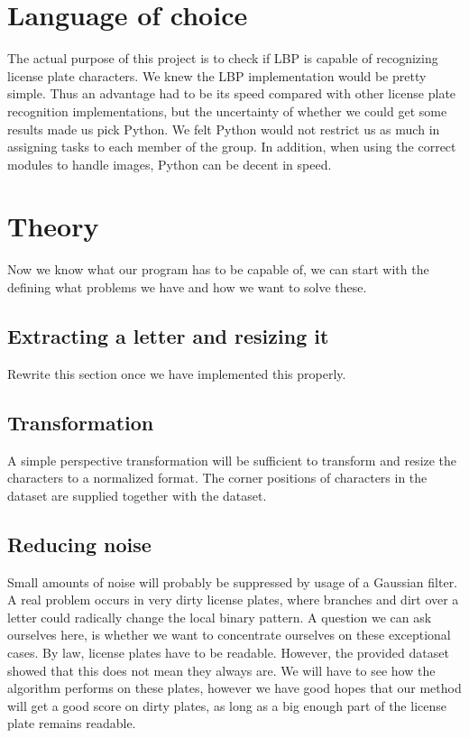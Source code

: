 \documentclass[a4paper]{article}
\begin{document}
\section{Language of choice}

The actual purpose of this project is to check if LBP is capable of recognizing
license plate characters. We knew the LBP implementation would be pretty
simple. Thus an advantage had to be its speed compared with other license plate 
recognition implementations, but the uncertainty of whether we could get some
results made us pick Python. We felt Python would not restrict us as much in 
assigning tasks to each member of the group. In addition, when using the
correct modules to handle images, Python can be decent in speed.

\section{Theory}

Now we know what our program has to be capable of, we can start with the
defining what problems we have and how we want to solve these.

\subsection{Extracting a letter and resizing it}

Rewrite this section once we have implemented this properly.

\subsection{Transformation}

A simple perspective transformation will be sufficient to transform and resize
the characters to a normalized format. The corner positions of characters in
the dataset are supplied together with the dataset.

\subsection{Reducing noise}

Small amounts of noise will probably be suppressed by usage of a Gaussian
filter. A real problem occurs in very dirty license plates, where branches and
dirt over a letter could radically change the local binary pattern. A question
we can ask ourselves here, is whether we want to concentrate ourselves on these
exceptional cases. By law, license plates have to be readable. However, the
provided dataset showed that this does not mean they always are. We will have
to see how the algorithm performs on these plates, however we have good hopes
that our method will get a good score on dirty plates, as long as a big enough
part of the license plate remains readable.
\end{document}
